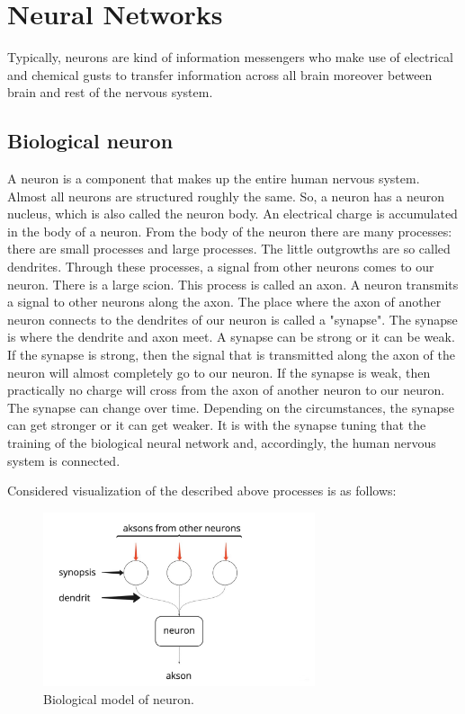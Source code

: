 \documentclass{article}
\begin{document}
\section{Neural Networks}
Typically, neurons are kind of information messengers who make use of electrical and chemical gusts to transfer information across all brain moreover between brain and rest of the nervous system.

\subsection{Biological neuron}
A neuron is a component that makes up the entire human nervous system. Almost all neurons are structured roughly the same. So, a neuron has a neuron nucleus, which is also called the neuron body. An electrical charge is accumulated in the body of a neuron. From the body of the neuron there are many processes: there are small processes and large processes. The little outgrowths are so called dendrites. Through these processes, a signal from other neurons comes to our neuron. There is a large scion. This process is called an axon. A neuron transmits a signal to other neurons along the axon. The place where the axon of another neuron connects to the dendrites of our neuron is called a "synapse". The synapse is where the dendrite and axon meet. A synapse can be strong or it can be weak. If the synapse is strong, then the signal that is transmitted along the axon of the neuron will almost completely go to our neuron. If the synapse is weak, then practically no charge will cross from the axon of another neuron to our neuron. The synapse can change over time. Depending on the circumstances, the synapse can get stronger or it can get weaker. It is with the synapse tuning that the training of the biological neural network and, accordingly, the human nervous system is connected.

Considered visualization of the described above processes is as follows:
\begin{figure}[h]
    \centering \includegraphics[width=8cm]{images/biological_neuron.jpg}
    \caption {Biological model of neuron.}
\end{figure}    
\end{document}
